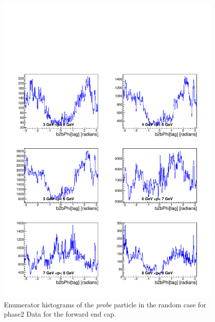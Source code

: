 \documentclass[a4paper,11pt,twosided,final,german,openbib,pdftex,listof=totoc,bibliography=totoc]{scrbook}
\begin{document}
\begin{appendix}
\begin{figure}[!htbp]
	\centering
	\includegraphics[width=\textwidth]{Plots/master/xPMPhiRandomFCD_Data}
	\caption[Momentum $\phi$ Random Forward End Cap Denominator Histogram Phase2 Data]{Enumerator histograms of the \textit{probe} particle in the random case for phase2 Data for the forward end cap.}
	\label{plt:PMPhiRandomFCD_Data}
\end{figure}






\end{appendix}
\end{document}
